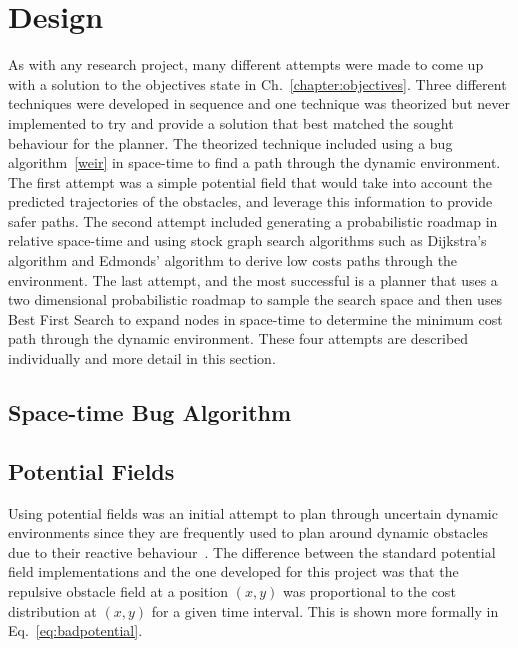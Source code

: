 


\chapter{Design}

\label{chapter:design}

As with any research project, many different attempts were made to come up with
a solution to the objectives state in Ch.~\ref{chapter:objectives}. Three
different techniques were developed in sequence and one technique was theorized
but never implemented to try and provide a solution that best matched the
sought behaviour for the planner.  The theorized technique included using a bug
algorithm~\ref{weir} in space-time to find a path through the dynamic
environment.  The first attempt was a simple potential field that would take
into account the predicted trajectories of the obstacles, and leverage this
information to provide safer paths. The second attempt included generating a
probabilistic roadmap in relative space-time and using stock graph search
algorithms such as Dijkstra's algorithm and Edmonds' algorithm to derive low
costs paths through the environment. The last attempt, and the most successful
is a planner that uses a two dimensional probabilistic roadmap to sample the
search space and then uses Best First Search to expand nodes in space-time to
determine the minimum cost path through the dynamic environment.  These four
attempts are described individually and more detail in this section.

\section{Space-time Bug Algorithm}

\section{Potential Fields}

Using potential fields was an initial attempt to plan through uncertain dynamic
environments since they are frequently used to plan around dynamic obstacles
due to their reactive behaviour~\cite{pf, wallar_taros_2013,
wallar_ssci_2014_boids}.  The difference between the standard potential field
implementations and the one developed for this project was that the repulsive
obstacle field at a position $(x, y)$ was proportional to the cost distribution
at $(x, y)$ for a given time interval.  This is shown more formally in
Eq.~\ref{eq:badpotential}.


